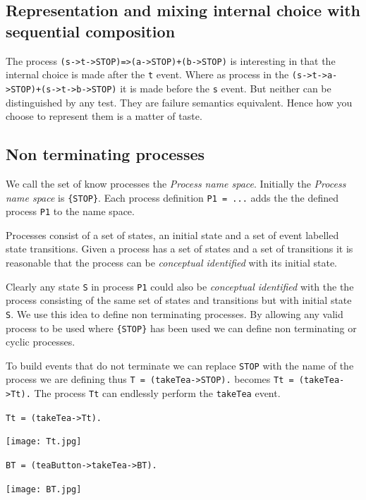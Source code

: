 \documentclass[]{article}
\begin{document}
\subsection{Representation and mixing internal choice with sequential composition}

The  process \verb$(s->t->STOP)=>(a->STOP)+(b->STOP)$ is interesting in that the internal choice is made after the \verb$t$ event. Where as  process in the  \verb$(s->t->a->STOP)+(s->t->b->STOP)$ it  is made before the \verb$s$ event. But neither can be distinguished by any test. They are failure semantics equivalent. Hence how you choose to represent them is a matter of taste.



\subsection{Non terminating processes}
We call the set of know  processes  the  \emph{Process name space}.   Initially the  \emph{Process name space} is \verb${STOP}$.    Each process definition \verb$P1 = ...$ adds the the defined process \verb$P1$ to the name space.

Processes consist of a set of states, an initial state  and a set of event labelled state transitions. Given  a process has a set of states and a set of transitions it is reasonable that the process can be \emph{conceptual identified} with its initial state.


Clearly any state \verb$S$ in process \verb|P1| could also  be \emph{conceptual identified}  with the the process consisting of the same set of states and transitions but with initial state \verb$S$.  We use this idea to define non terminating processes.  By allowing any valid process to be used where \verb${STOP}$ has been used we can define non terminating or cyclic processes.


To build events that do not terminate we can replace \verb$STOP$ with the name of the process we are defining thus \verb$T = (takeTea->STOP).$ becomes \verb$Tt = (takeTea->Tt).$  The  process \verb$Tt$ can endlessly perform the \verb$takeTea$ event.

\noindent
\begin{minipage}{0.45\textwidth}\begin{center}
\verb$Tt = (takeTea->Tt).$

\texttt{[image: Tt.jpg]} \end{center}\end{minipage}
\begin{minipage}{0.45\textwidth}
\begin{center}
\verb$BT = (teaButton->takeTea->BT).$

\texttt{[image: BT.jpg]}\end{center} \end{minipage}
\end{document}
